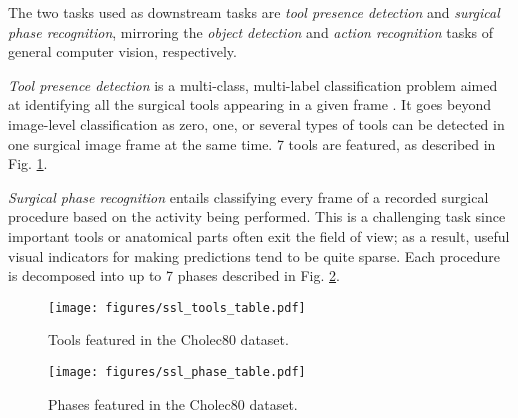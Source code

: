 \documentclass[times,twocolumn,final]{elsarticle}
\begin{document}
The two tasks used as downstream tasks are \textit{tool presence detection} and \textit{surgical phase recognition}, mirroring the \textit{object detection} and \textit{action recognition} tasks of general computer vision, respectively.

\textit{Tool presence detection} is a multi-class, multi-label classification problem aimed at identifying all the surgical tools appearing in a given frame \citep{twinanda2016endonet,nwoye2019weakly,al2018monitoring}. It goes beyond image-level classification as zero, one, or several types of tools can be detected in one surgical image frame at the same time. 7 tools are featured, as described in Fig. \ref{fig:tool_types}.

\textit{Surgical phase recognition} entails classifying every frame of a recorded surgical procedure based on the activity being performed. This is a challenging task since important tools or anatomical parts often exit the field of view; as a result, useful visual indicators for making predictions tend to be quite sparse. Each procedure is decomposed into up to 7 phases described in Fig. \ref{fig:phase_table}.
\begin{figure}[ht]
\centering
\texttt{[image: figures/ssl\_tools\_table.pdf]}
\caption{Tools featured in the Cholec80 dataset.}
\label{fig:tool_types}
\end{figure}
\begin{figure}[ht]
\texttt{[image: figures/ssl\_phase\_table.pdf]}
\caption{Phases featured in the Cholec80 dataset.}
\label{fig:phase_table}
\end{figure}
\\
\end{document}
